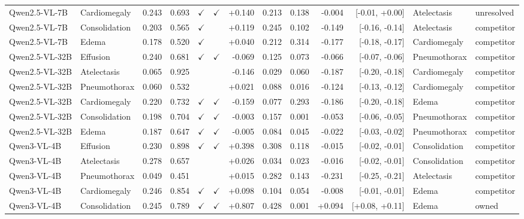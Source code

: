 \begin{longtable}{llrrccrrrrrll}
Qwen2.5-VL-7B & Cardiomegaly & 0.243 & 0.693 & $\checkmark$ & $\checkmark$ & +0.140 & 0.213 & 0.138 & -0.004 & [-0.01, +0.00] & Atelectasis & unresolved \\
Qwen2.5-VL-7B & Consolidation & 0.203 & 0.565 & $\checkmark$ &  & +0.119 & 0.245 & 0.102 & -0.149 & [-0.16, -0.14] & Atelectasis & competitor \\
Qwen2.5-VL-7B & Edema & 0.178 & 0.520 & $\checkmark$ &  & +0.040 & 0.212 & 0.314 & -0.177 & [-0.18, -0.17] & Cardiomegaly & competitor \\
Qwen2.5-VL-32B & Effusion & 0.240 & 0.681 & $\checkmark$ & $\checkmark$ & -0.069 & 0.125 & 0.073 & -0.066 & [-0.07, -0.06] & Pneumothorax & competitor \\
Qwen2.5-VL-32B & Atelectasis & 0.065 & 0.925 &  &  & -0.146 & 0.029 & 0.060 & -0.187 & [-0.20, -0.18] & Cardiomegaly & competitor \\
Qwen2.5-VL-32B & Pneumothorax & 0.060 & 0.532 &  &  & +0.021 & 0.088 & 0.016 & -0.124 & [-0.13, -0.12] & Cardiomegaly & competitor \\
Qwen2.5-VL-32B & Cardiomegaly & 0.220 & 0.732 & $\checkmark$ & $\checkmark$ & -0.159 & 0.077 & 0.293 & -0.186 & [-0.20, -0.18] & Edema & competitor \\
Qwen2.5-VL-32B & Consolidation & 0.198 & 0.704 & $\checkmark$ & $\checkmark$ & -0.003 & 0.157 & 0.001 & -0.053 & [-0.06, -0.05] & Pneumothorax & competitor \\
Qwen2.5-VL-32B & Edema & 0.187 & 0.647 & $\checkmark$ & $\checkmark$ & -0.005 & 0.084 & 0.045 & -0.022 & [-0.03, -0.02] & Pneumothorax & competitor \\
Qwen3-VL-4B & Effusion & 0.230 & 0.898 & $\checkmark$ & $\checkmark$ & +0.398 & 0.308 & 0.118 & -0.015 & [-0.02, -0.01] & Consolidation & competitor \\
Qwen3-VL-4B & Atelectasis & 0.278 & 0.657 &  &  & +0.026 & 0.034 & 0.023 & -0.016 & [-0.02, -0.01] & Consolidation & competitor \\
Qwen3-VL-4B & Pneumothorax & 0.049 & 0.451 &  &  & +0.015 & 0.282 & 0.143 & -0.231 & [-0.25, -0.21] & Atelectasis & competitor \\
Qwen3-VL-4B & Cardiomegaly & 0.246 & 0.854 & $\checkmark$ & $\checkmark$ & +0.098 & 0.104 & 0.054 & -0.008 & [-0.01, -0.01] & Edema & competitor \\
\rowcolor{cfSlate2}Qwen3-VL-4B & Consolidation & 0.245 & 0.789 & $\checkmark$ & $\checkmark$ & +0.807 & 0.428 & 0.001 & +0.094 & [+0.08, +0.11] & Edema & owned \\

\end{longtable}

